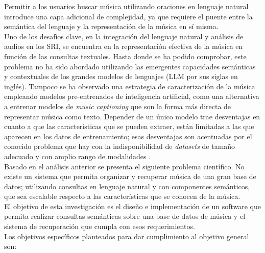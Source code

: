Permitir a los usuarios buscar música utilizando oraciones en lenguaje natural introduce una capa adicional de complejidad, ya que requiere el puente entre la semántica del lenguaje y la representación de la música en sí misma.\\
Uno de los desafíos clave, en la integración del lenguaje natural y análisis de audios en los SRI, se encuentra en la representación efectiva de la música en función de las consultas textuales. Hasta donde se ha podido comprobar, este problema no ha sido abordado utilizando las emergentes capacidades semánticas y contextuales de los grandes modelos de lenguajes (LLM por sus siglas en inglés). Tampoco se ha observado una estrategia de caracterización de la música empleando modelos pre-entrenados de inteligencia artificial, como una alternativa a entrenar modelos de \textit{music captioning} que son la forma más directa de representar música como texto. Depender de un único modelo trae desventajas en cuanto a que las características que se pueden extraer, están limitadas a las que aparecen en los datos de entrenamiento; esas desventajas son acentuadas por el conocido problema que hay con la indisponibilidad de \textit{datasets} de tamaño adecuado y con amplio rango de modalidades \cite{Simonetta2019MultimodalMI}. \\ 

Basado en el análisis anterior se presenta el siguiente problema científico.
No existe un sistema que permita organizar y recuperar música de una gran base de datos; utilizando consultas en lenguaje natural y con componentes semánticos, que sea escalable respecto a las características que se conocen de la música. \\

El objetivo de esta investigación es el diseño e implementación de un software que permita realizar consultas semánticas sobre una base de datos de música y el sistema de recuperación que cumpla con esos requerimientos.\\

Los objetivos específicos planteados para dar cumplimiento al objetivo general son:
 
